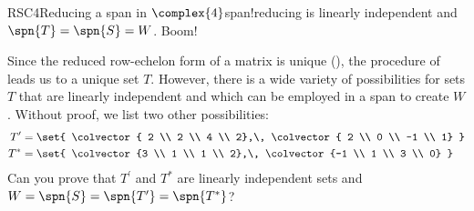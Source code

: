 \begin{example}{RSC4}{Reducing a span in $\complex{4}$}{span!reducing}
%
is linearly independent and $\spn{T}=\spn{S}=W$.  Boom!\par
%
Since the reduced row-echelon form of a matrix is unique (), the procedure of  leads us to a unique set $T$.  However, there is a wide variety of possibilities for sets $T$ that are linearly independent and which can be employed in a span to create $W$.  Without proof, we list two other possibilities:
%
\begin{align*}
T^{\prime}&=\set{
\colvector{ 2 \\ 2 \\ 4 \\ 2},\,
\colvector{ 2 \\ 0 \\ -1 \\ 1}
}\\
T^{*}&=\set{
\colvector{3 \\ 1 \\ 1 \\ 2},\,
\colvector{-1 \\ 1 \\ 3 \\ 0}
}
\end{align*}
%
Can you prove that $T^{\prime}$ and $T^{*}$ are linearly independent sets and $W=\spn{S}=\spn{T^{\prime}}=\spn{T^{*}}$?
%
\end{example}
%
%
